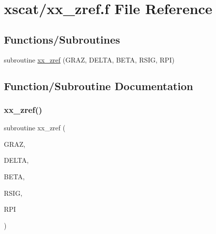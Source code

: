 \hypertarget{xx__zref_8f}{}\section{xscat/xx\+\_\+zref.f File Reference}
\label{xx__zref_8f}
\subsection*{Functions/\+Subroutines}
\begin{DoxyCompactItemize}
\item 
subroutine \hyperlink{xx__zref_8f_a4c8c6fb2ab57945105b6f38fc4f24ca2}{xx\+\_\+zref} (G\+R\+AZ, D\+E\+L\+TA, B\+E\+TA, R\+S\+IG, R\+PI)
\end{DoxyCompactItemize}


\subsection{Function/\+Subroutine Documentation}
\mbox{\label{xx__zref_8f_a4c8c6fb2ab57945105b6f38fc4f24ca2}} 
\subsubsection{\texorpdfstring{xx\+\_\+zref()}{xx\_zref()}}
{\footnotesize\ttfamily subroutine xx\+\_\+zref (\begin{DoxyParamCaption}\item[{}]{G\+R\+AZ,  }\item[{}]{D\+E\+L\+TA,  }\item[{}]{B\+E\+TA,  }\item[{}]{R\+S\+IG,  }\item[{}]{R\+PI }\end{DoxyParamCaption})}

